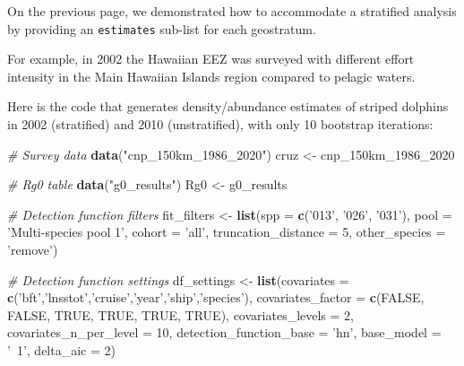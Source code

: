 \documentclass[
]{book}
\newenvironment{Shaded}{\begin{snugshade}}{\end{snugshade}}
\newcommand{\CommentTok}[1]{\textcolor[rgb]{0.56,0.35,0.01}{\textit{#1}}}
\newcommand{\DataTypeTok}[1]{\textcolor[rgb]{0.13,0.29,0.53}{#1}}
\newcommand{\DecValTok}[1]{\textcolor[rgb]{0.00,0.00,0.81}{#1}}
\newcommand{\KeywordTok}[1]{\textcolor[rgb]{0.13,0.29,0.53}{\textbf{#1}}}
\newcommand{\NormalTok}[1]{#1}
\newcommand{\OtherTok}[1]{\textcolor[rgb]{0.56,0.35,0.01}{#1}}
\newcommand{\StringTok}[1]{\textcolor[rgb]{0.31,0.60,0.02}{#1}}
\begin{document}
On the previous page, we demonstrated how to accommodate a stratified analysis by providing an \texttt{estimates} sub-list for each geostratum.

For example, in 2002 the Hawaiian EEZ was surveyed with different effort intensity in the Main Hawaiian Islands region compared to pelagic waters.

Here is the code that generates density/abundance estimates of striped dolphins in 2002 (stratified) and 2010 (unstratified), with only 10 bootstrap iterations:

\begin{Shaded}
\begin{Highlighting}[]
\CommentTok{# Survey data}
\KeywordTok{data}\NormalTok{(}\StringTok{"cnp_150km_1986_2020"}\NormalTok{)}
\NormalTok{cruz <-}\StringTok{ }\NormalTok{cnp_150km_}\DecValTok{1986}\NormalTok{_}\DecValTok{2020}

\CommentTok{# Rg0 table}
\KeywordTok{data}\NormalTok{(}\StringTok{"g0_results"}\NormalTok{)}
\NormalTok{Rg0 <-}\StringTok{ }\NormalTok{g0_results}

\CommentTok{# Detection function filters}
\NormalTok{fit_filters <-}\StringTok{ }\KeywordTok{list}\NormalTok{(}\DataTypeTok{spp =} \KeywordTok{c}\NormalTok{(}\StringTok{'013'}\NormalTok{, }\StringTok{'026'}\NormalTok{, }\StringTok{'031'}\NormalTok{), }
                   \DataTypeTok{pool =} \StringTok{'Multi-species pool 1'}\NormalTok{,}
                   \DataTypeTok{cohort =} \StringTok{'all'}\NormalTok{,}
                   \DataTypeTok{truncation_distance =} \DecValTok{5}\NormalTok{,}
                   \DataTypeTok{other_species =} \StringTok{'remove'}\NormalTok{)}

\CommentTok{# Detection function settings}
\NormalTok{df_settings <-}\StringTok{ }\KeywordTok{list}\NormalTok{(}\DataTypeTok{covariates =} \KeywordTok{c}\NormalTok{(}\StringTok{'bft'}\NormalTok{,}\StringTok{'lnsstot'}\NormalTok{,}\StringTok{'cruise'}\NormalTok{,}\StringTok{'year'}\NormalTok{,}\StringTok{'ship'}\NormalTok{,}\StringTok{'species'}\NormalTok{),}
                   \DataTypeTok{covariates_factor =} \KeywordTok{c}\NormalTok{(}\OtherTok{FALSE}\NormalTok{, }\OtherTok{FALSE}\NormalTok{, }\OtherTok{TRUE}\NormalTok{, }\OtherTok{TRUE}\NormalTok{, }\OtherTok{TRUE}\NormalTok{, }\OtherTok{TRUE}\NormalTok{),}
                   \DataTypeTok{covariates_levels =} \DecValTok{2}\NormalTok{,}
                   \DataTypeTok{covariates_n_per_level =} \DecValTok{10}\NormalTok{,}
                   \DataTypeTok{detection_function_base =} \StringTok{'hn'}\NormalTok{,}
                   \DataTypeTok{base_model =} \StringTok{'~1'}\NormalTok{,}
                   \DataTypeTok{delta_aic =} \DecValTok{2}\NormalTok{)}


\end{Highlighting}
\end{Shaded}
\end{document}
